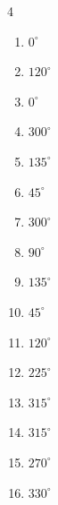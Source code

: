 \begin{multicols}{4}
\begin{enumerate}
  \item $\displaystyle 0^{\circ}$
        \phantom{$\displaystyle =0$}

  \item $\displaystyle 120^{\circ}$

  \item $\displaystyle 0^{\circ}$
        \phantom{$\displaystyle =0$}

  \item $\displaystyle 300^{\circ}$

  \item $\displaystyle 135^{\circ}$

  \item $\displaystyle 45^{\circ}$

  \item $\displaystyle 300^{\circ}$

  \item $\displaystyle 90^{\circ}$

  \item $\displaystyle 135^{\circ}$

  \item $\displaystyle 45^{\circ}$

  \item $\displaystyle 120^{\circ}$

  \item $\displaystyle 225^{\circ}$

  \item $\displaystyle 315^{\circ}$

  \item $\displaystyle 315^{\circ}$

  \item $\displaystyle 270^{\circ}$

  \item $\displaystyle 330^{\circ}$


\end{enumerate}
\end{multicols}
